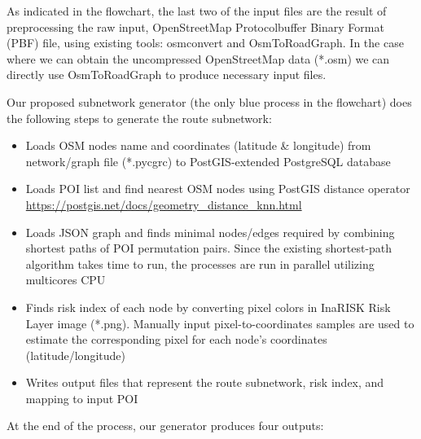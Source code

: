 \documentclass[conference]{IEEEtran}
\begin{document}
As indicated in the flowchart, the last two of the input files are the result of preprocessing the raw input, OpenStreetMap Protocolbuffer Binary Format (PBF) file, using existing tools: osmconvert\cite{OpenStreetMap2019OsmConvert} and OsmToRoadGraph\cite{Gemsa2017OsmToRoadGraph}. In the case where we can obtain the uncompressed OpenStreetMap data (*.osm) we can directly use OsmToRoadGraph to produce necessary input files.

Our proposed subnetwork generator (the only blue process in the flowchart) does the following steps to generate the route subnetwork:

\begin{itemize}


\item Loads OSM nodes name and coordinates (latitude \& longitude) from network/graph file (*.pycgrc) to PostGIS-extended PostgreSQL database

\item Loads POI list and find nearest OSM nodes using PostGIS distance operator \url{https://postgis.net/docs/geometry_distance_knn.html} 

\item Loads JSON graph and finds minimal nodes/edges required by combining shortest paths of POI permutation pairs. Since the existing shortest-path algorithm takes time to run, the processes are run in parallel utilizing multicores CPU

\item Finds risk index of each node by converting pixel colors in InaRISK Risk Layer image (*.png). Manually input pixel-to-coordinates samples are used to estimate the corresponding pixel for each node's coordinates (latitude/longitude)

\item Writes output files that represent the route subnetwork, risk index, and mapping to input POI

\end{itemize}

At the end of the process, our generator produces four outputs:
\end{document}
